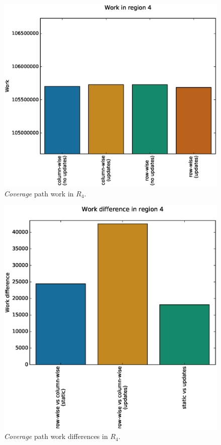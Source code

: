 \documentclass{tamuccthesis}
\begin{document}
\begin{figure}
    \captionsetup{justification=centering}
    \centering
    \includegraphics[width=\textwidth,trim={0cm 0cm 0cm 0.75cm},clip]{work_r4.eps}
    \caption{\textit{Coverage} path work in $R_4$.}
    \label{fig:coverage_noterrain_work_r4}
\end{figure}
\begin{figure}
    \captionsetup{justification=centering}
    \centering
    \includegraphics[width=\textwidth,trim={0cm 0cm 0cm 0.75cm},clip]{diff_r4.eps}
    \caption{\textit{Coverage} path work differences in $R_4$.}
    \label{fig:coverage_noterrain_diff_r4}
\end{figure}
\end{document}
